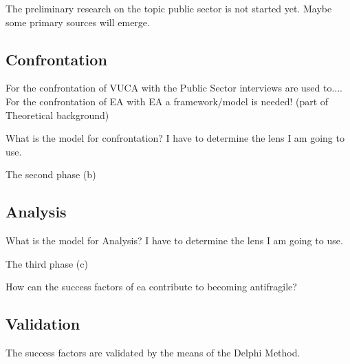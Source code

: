 \begin{remark}
	The preliminary research on the topic public sector is not started yet. Maybe some primary sources will emerge.
\end{remark}

\subsection{Confrontation}
\label{sub:confrontationphase}

For the confrontation of VUCA with the Public Sector interviews are used to....\\
For the confrontation of EA with EA a framework/model is needed! (part of Theoretical background)

\begin{remark}
	What is the model for confrontation?
	I have to determine the lens I am going to use.
\end{remark}

The second phase (b) 

\subsection{Analysis}
\label{sub:analysisphase}

\begin{remark}
	What is the model for Analysis?
	I have to determine the lens I am going to use.
\end{remark}

The third phase (c)

How can the success factors of \acrlong{ea} contribute to becoming antifragile?

\subsection{Validation}
\label{sub:validatinphase}
The success factors are validated by the means of the Delphi Method.


